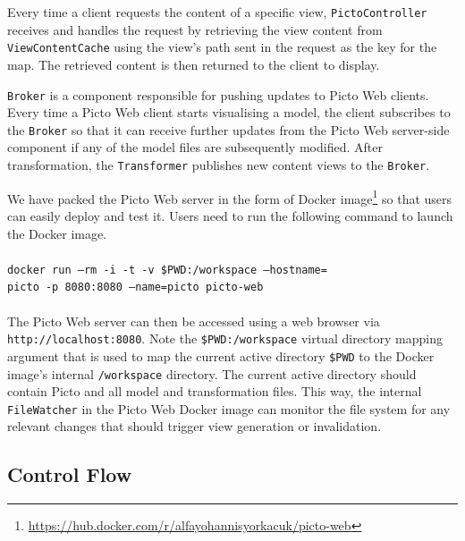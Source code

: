 \documentclass[sigconf,review]{acmart}
\begin{document}
Every time a client requests the content of a specific view, \texttt{PictoController} receives and handles the request by retrieving the view content from \texttt{ViewContentCache} using the view's path sent in the request as the key for the map. The retrieved content is then returned to the client to display.

\texttt{Broker} is a component responsible for pushing updates to Picto Web clients. Every time a Picto Web client starts visualising a model, the client subscribes to the \texttt{Broker} so that it can receive further updates from the Picto Web server-side component if any of the model files are subsequently modified. After transformation, the \texttt{Transformer} publishes new content views to the \texttt{Broker}.

We have packed the Picto Web server in the form of Docker image\footnote{\url{https://hub.docker.com/r/alfayohannisyorkacuk/picto-web}} so that users can easily deploy and test it. Users need to run the following command to launch the Docker image.\\\\ 
%
\texttt{docker run --rm -i -t -v \$PWD:/workspace --hostname=\\picto -p 8080:8080 --name=picto picto-web}\\\\
%
The Picto Web server can then be accessed using a web browser via \texttt{http://localhost:8080}. Note the \texttt{\$PWD:/workspace} virtual directory mapping argument that is used to map the current active directory \texttt{\$PWD} to  the Docker image's internal \texttt{/workspace} directory. The current active directory should contain Picto and all model and transformation files. This way, the internal \texttt{FileWatcher} in the Picto Web Docker image can monitor the file system for any relevant changes that should trigger view generation or invalidation.

\subsection{Control Flow}
\end{document}
